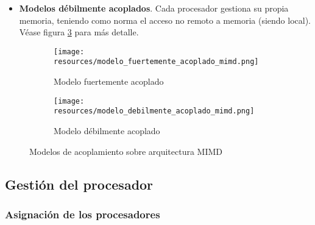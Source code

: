 \documentclass[a4paper, 11pt, titlepage]{article}
\begin{document}
\begin{itemize}
\begin{itemize}
                \begin{itemize}
                    \item \textbf{UMA} o acceso uniforme a memoria.
                    \item \textbf{NUMA} o acceso no uniforme a memoria, donde  la  velocidad  de acceso a 
                    distintas zonas de memoria puede ser distinta.
                \end{itemize}

                Véase figura \ref{modelo_fuertemente_acoplado} para más detalle.
        
                \item \textbf{Modelos   débilmente   acoplados}. Cada procesador gestiona su propia 
                memoria, teniendo como norma el acceso no remoto a memoria (siendo local). Véase figura 
                \ref{modelo_debilmente_acoplado} para más detalle.
            \end{itemize}

            \begin{figure}[!tbp]
                \begin{subfigure}[b]{0.5\textwidth}
                  \texttt{[image: resources/modelo\_fuertemente\_acoplado\_mimd.png]}
                  \caption{Modelo fuertemente acoplado}
                  \label{modelo_fuertemente_acoplado}
                \end{subfigure}
                \hfill
                \begin{subfigure}[b]{0.5\textwidth}
                  \texttt{[image: resources/modelo\_debilmente\_acoplado\_mimd.png]}
                  \caption{Modelo débilmente acoplado}
                  \label{modelo_debilmente_acoplado}
                \end{subfigure}
                \caption{Modelos de acoplamiento sobre arquitectura MIMD}
              \end{figure}
        \end{itemize}

    \subsection{Gestión del procesador}

        \subsubsection{Asignación de los procesadores}
\end{document}
